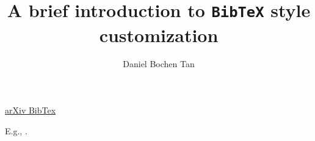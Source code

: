 \documentclass{article}
\title{A brief introduction to \texttt{BibTeX} style customization}
\author{Daniel Bochen Tan}
\begin{document}
\maketitle

\href{https://arxiv.org/help/hypertex/bibstyles}{arXiv BibTex}

E.g., \cite{pra19-cross-quantum-volume}.
    


\end{document}
